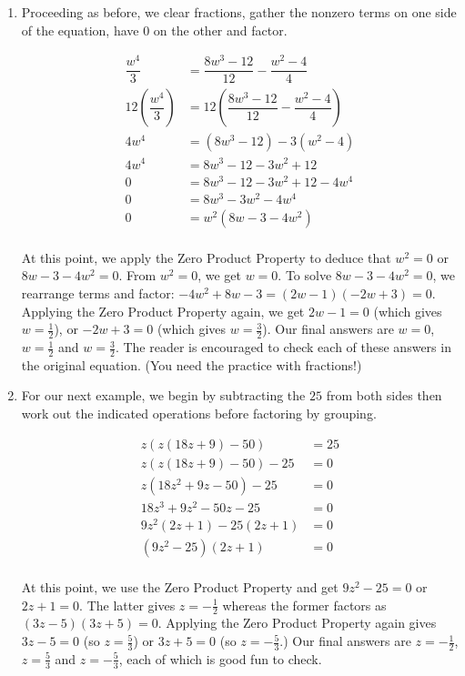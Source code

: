 \begin{ex}
\begin{enumerate}
\item Proceeding as before, we clear fractions, gather the nonzero terms on one side of the equation, have $0$ on the other and factor.

\begin{align*}
\dfrac{w^4}{3} & = \dfrac{8w^3-12}{12} - \dfrac{w^2-4}{4} \\
12 \left(\dfrac{w^4}{3}\right) & = 12 \left(\dfrac{8w^3-12}{12} - \dfrac{w^2-4}{4} \right) \tag{Multiply by $12$}\\
4w^4 & = (8w^3 - 12) - 3(w^2-4) \tag{Distribute} \\
4w^4 & = 8w^3 - 12 - 3w^2 + 12 \tag{Distribute} \\
0 & = 8w^3 - 12 - 3w^2 + 12  - 4w^4 \tag{Subtract $4w^4$} \\
0 & = 8w^3  - 3w^2 - 4w^4 \tag{Gather like terms} \\
0 & = w^2(8w - 3 - 4w^2) \tag{Factor out G.C.F.} \\
\end{align*}

At this point, we  apply the Zero Product Property to deduce that $w^2 = 0$ or $8w - 3 - 4w^2 = 0$. From $w^2 = 0$, we get $w = 0$. To solve $8w - 3 - 4w^2 = 0$, we rearrange terms and factor:  $-4w^2 + 8w - 3= (2w - 1)(-2w+3) = 0$.  Applying the Zero Product Property again, we get $2w - 1= 0$ (which gives $w = \frac{1}{2}$), or $-2w+3 = 0$ (which gives $w = \frac{3}{2}$).  Our final answers are $w = 0$, $w = \frac{1}{2}$ and $w = \frac{3}{2}$.  The reader is encouraged to check each of these answers in the original equation.  (You need the practice with fractions!)

\item  For our next example, we begin by subtracting the $25$ from both sides then work out the indicated operations before factoring by grouping.

\begin{align*}
z(z(18z+9)-50) & = 25 \\
z(z(18z+9)-50) - 25 & = 0 \tag{Subtract $25$} \\
z(18z^2 + 9z - 50) - 25 & = 0 \tag{Distribute} \\
18z^3 + 9z^2 - 50z - 25 & = 0 \tag{Distribute} \\
9z^2(2z + 1) - 25(2z + 1) & = 0 \tag{Factor} \\
(9z^2 - 25)(2z+1) & = 0 \tag{Factor} \\
\end{align*}

At this point, we use the Zero Product Property and get $9z^2 - 25 = 0$ or $2z + 1 = 0$.  The latter gives $z = -\frac{1}{2}$ whereas the former  factors as $(3z - 5)(3z+5) = 0$.  Applying the Zero Product Property again gives $3z-5 = 0$ (so $z = \frac{5}{3}$) or $3z+5 = 0$ (so $z = -\frac{5}{3}$.) Our final answers are $z = -\frac{1}{2}$,  $z = \frac{5}{3}$ and $z = -\frac{5}{3}$, each of which is good fun to check.


\end{enumerate}
\end{ex}
